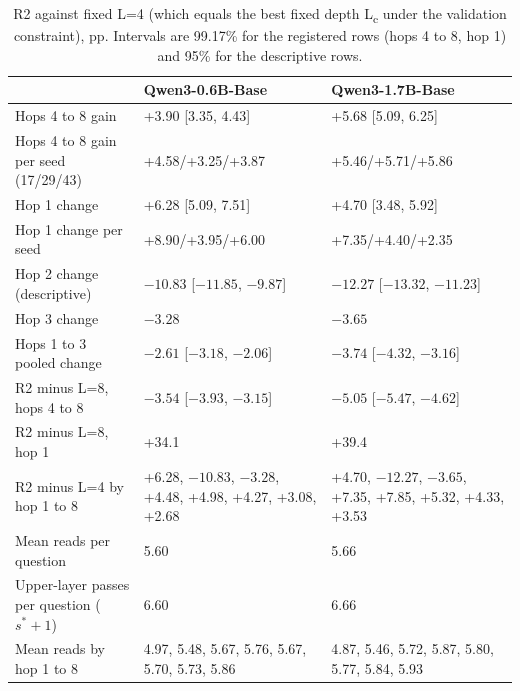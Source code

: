\begin{table}[htbp]
\centering\footnotesize
\caption{R2 against fixed L=4 (which equals the best fixed depth L\textsubscript{c} under the validation constraint), pp.  %
Intervals are 99.17\% for the registered rows (hops 4 to 8, hop 1) and 95\% for the descriptive rows.}
\label{tab:i-lsr}
\begin{tabular}{@{}W{400}{4}W{300}{4}W{300}{4}@{}}
\toprule
 & Qwen3-0.6B-Base & Qwen3-1.7B-Base \\
\midrule
Hops 4 to 8 gain & +3.90 [3.35, 4.43] & +5.68 [5.09, 6.25] \\ \addlinespace[3pt]
Hops 4 to 8 gain per seed (17/29/43) & +4.58/+3.25/+3.87 & +5.46/+5.71/+5.86 \\ \addlinespace[3pt]
Hop 1 change & +6.28 [5.09, 7.51] & +4.70 [3.48, 5.92] \\ \addlinespace[3pt]
Hop 1 change per seed & +8.90/+3.95/+6.00 & +7.35/+4.40/+2.35 \\ \addlinespace[3pt]
Hop 2 change (descriptive) & $-10.83$ [$-11.85$, $-9.87$] & $-12.27$ [$-13.32$, $-11.23$] \\ \addlinespace[3pt]
Hop 3 change & $-3.28$ & $-3.65$ \\ \addlinespace[3pt]
Hops 1 to 3 pooled change & $-2.61$ [$-3.18$, $-2.06$] & $-3.74$ [$-4.32$, $-3.16$] \\ \addlinespace[3pt]
R2 minus L=8, hops 4 to 8 & $-3.54$ [$-3.93$, $-3.15$] & $-5.05$ [$-5.47$, $-4.62$] \\ \addlinespace[3pt]
R2 minus L=8, hop 1 & +34.1 & +39.4 \\ \addlinespace[3pt]
R2 minus L=4 by hop 1 to 8 & +6.28, $-10.83$, $-3.28$, +4.48, +4.98, +4.27, +3.08, +2.68 & +4.70, $-12.27$, $-3.65$, +7.35, +7.85, +5.32, +4.33, +3.53 \\ \addlinespace[3pt]
Mean reads per question & 5.60 & 5.66 \\ \addlinespace[3pt]
Upper-layer passes per question ($s^{*}+1$) & 6.60 & 6.66 \\ \addlinespace[3pt]
Mean reads by hop 1 to 8 & 4.97, 5.48, 5.67, 5.76, 5.67, 5.70, 5.73, 5.86 & 4.87, 5.46, 5.72, 5.87, 5.80, 5.77, 5.84, 5.93 \\
\bottomrule
\end{tabular}
\end{table}

